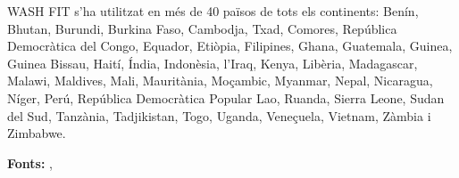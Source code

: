 WASH FIT s’ha utilitzat en més de 40 països de tots els continents:
Benín, Bhutan, Burundi, Burkina Faso, Cambodja, Txad, Comores, República Democràtica del Congo, Equador, Etiòpia, Filipines, Ghana, Guatemala, Guinea, Guinea Bissau, Haití, Índia, Indonèsia, l’Iraq, Kenya, Libèria, Madagascar, Malawi, Maldives, Mali, Mauritània, Moçambic, Myanmar, Nepal, Nicaragua, Níger, Perú, República Democràtica Popular Lao, Ruanda, Sierra Leone, Sudan del Sud, Tanzània, Tadjikistan, Togo, Uganda, Veneçuela, Vietnam, Zàmbia i Zimbabwe.

\textbf{Fonts:} \cite{Wash1},~\cite{Wash2}

